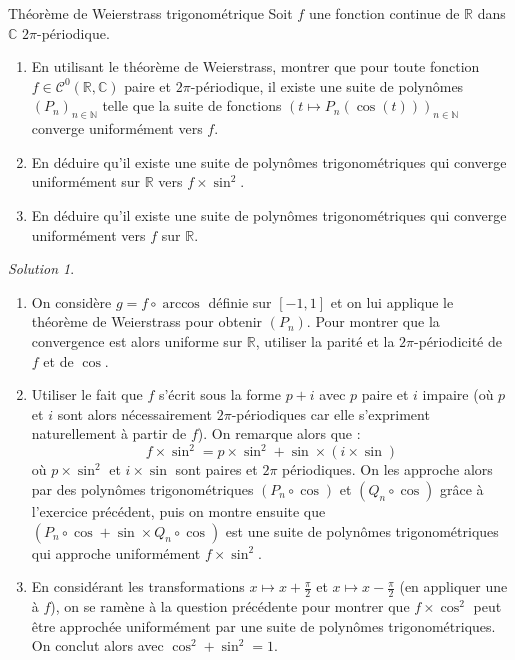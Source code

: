 \documentclass[french]{book}
\newcommand{\N}{\mathbb{N}}
\newcommand{\R}{\mathbb{R}}
\newcommand{\C}{\mathbb{C}}
\theoremstyle{definition}
\theoremstyle{remark}
\newtheorem*{sol}{Solution}
\begin{document}
\begin{exo}[2]{Théorème de Weierstrass trigonométrique}
	Soit $f$ une fonction continue de $\R$ dans $\C$ $2\pi$-périodique.
	\begin{enumerate}
		\item En utilisant le théorème de Weierstrass, montrer que pour toute fonction $f\in\mathcal{C}^0(\R,\C)$ paire et $2\pi$-périodique, il existe une suite de polynômes $(P_n)_{n\in\N}$ telle que la suite de fonctions $(t\mapsto P_n(\cos(t)))_{n\in\N}$ converge uniformément vers $f$.
		\item En déduire qu'il existe une suite de polynômes trigonométriques qui converge uniformément sur $\R$ vers $f\times\sin^2$.
		\item En déduire qu'il existe une suite de polynômes trigonométriques qui converge uniformément vers $f$ sur $\R$.
	\end{enumerate}
\end{exo}
\begin{sol}
	\begin{enumerate}
		\item On considère $g=f\circ\arccos$ définie sur $[-1,1]$ et on lui applique le théorème de Weierstrass pour obtenir $(P_n)$. Pour montrer que la convergence est alors uniforme sur $\R$, utiliser la parité et la $2\pi$-périodicité de $f$ et de $\cos$.
		\item Utiliser le fait que $f$ s'écrit sous la forme $p+i$ avec $p$ paire et $i$ impaire (où $p$ et $i$ sont alors nécessairement $2\pi$-périodiques car elle s'expriment naturellement à partir de $f$). On remarque alors que : $$f\times\sin^2=p\times\sin^2+\sin\times(i\times\sin)$$ où $p\times\sin^2$ et $i\times\sin$ sont paires et $2\pi$ périodiques. On les approche alors par des polynômes trigonométriques $(P_n\circ\cos)$ et $(Q_n\circ\cos)$ grâce à l'exercice précédent, puis on montre ensuite que $(P_n\circ\cos+\sin\times Q_n\circ\cos)$ est une suite de polynômes trigonométriques qui approche uniformément $f\times\sin^2$.
		\item En considérant les transformations $x\mapsto x+\displaystyle\frac{\pi}{2}$ et $x\mapsto x-\displaystyle\frac{\pi}{2}$ (en appliquer une à $f$), on se ramène à la question précédente pour montrer que $f\times\cos^2$ peut être approchée uniformément par une suite de polynômes trigonométriques. On conclut alors avec $\cos^2+\sin^2=1$.
	\end{enumerate}
\end{sol}
\end{document}
